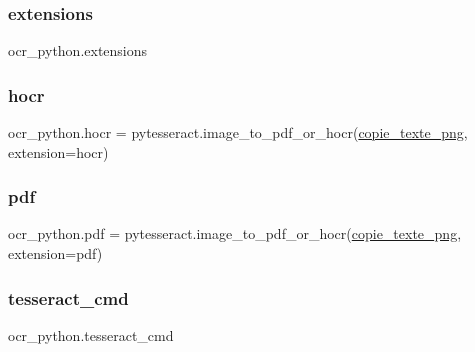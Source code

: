 \mbox{\label{namespaceocr__python_a5244904f6594bc29e83b939e88e691f6}} 
\subsubsection{\texorpdfstring{extensions}{extensions}}
{\footnotesize\ttfamily ocr\+\_\+python.\+extensions}

\mbox{\label{namespaceocr__python_a2b74ea39e69c0b623dd1e78199ced342}} 
\subsubsection{\texorpdfstring{hocr}{hocr}}
{\footnotesize\ttfamily ocr\+\_\+python.\+hocr = pytesseract.\+image\+\_\+to\+\_\+pdf\+\_\+or\+\_\+hocr(\hyperlink{namespaceocr__python_ad4d9e12f19b02ca8c63a6c39a06d7eaf}{copie\+\_\+texte\+\_\+png}, extension=\textquotesingle{}hocr\textquotesingle{})}

\mbox{\label{namespaceocr__python_aa792eb72c7c96aa527c680ff3c5a0cf8}} 
\subsubsection{\texorpdfstring{pdf}{pdf}}
{\footnotesize\ttfamily ocr\+\_\+python.\+pdf = pytesseract.\+image\+\_\+to\+\_\+pdf\+\_\+or\+\_\+hocr(\hyperlink{namespaceocr__python_ad4d9e12f19b02ca8c63a6c39a06d7eaf}{copie\+\_\+texte\+\_\+png}, extension=\textquotesingle{}pdf\textquotesingle{})}

\mbox{\label{namespaceocr__python_a2d32b3cf2589f7d6bb2258a51aa10c30}} 
\subsubsection{\texorpdfstring{tesseract\+\_\+cmd}{tesseract\_cmd}}
{\footnotesize\ttfamily ocr\+\_\+python.\+tesseract\+\_\+cmd}

